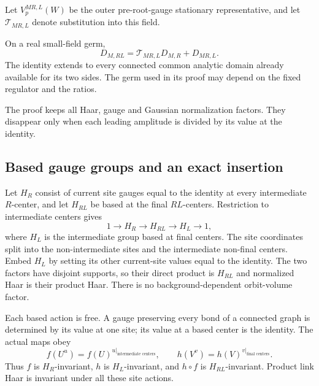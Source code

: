 Let $V_p^{MR,L}(W)$ be the outer pre-root-gauge stationary
representative, and let $\mathcal T_{MR,L}$ denote substitution
into this field.

\begin{theorem}
\label{olc-theorem}
On a real small-field germ,
\begin{equation}
 D_{M,RL}
   =\mathcal T_{MR,L}D_{M,R}+D_{MR,L}.
 \label{olc-cocycle}
\end{equation}
The identity extends to every connected common analytic domain
already available for its two sides. The germ used in its proof
may depend on the fixed regulator and the ratios.
\end{theorem}

The proof keeps all Haar, gauge and Gaussian normalization
factors. They disappear only when each leading amplitude is
divided by its value at the identity.

\subsection{Based gauge groups and an exact insertion}
\label{olc-groups-section}

Let $H_R$ consist of current site gauges equal to the identity
at every intermediate $R$-center, and let $H_{RL}$ be based
at the final $RL$-centers. Restriction to intermediate centers
gives
\begin{equation}
 1\longrightarrow H_R\longrightarrow H_{RL}
       \longrightarrow H_L\longrightarrow1,
 \label{olc-group-sequence}
\end{equation}
where $H_L$ is the intermediate group based at final centers.
The site coordinates split into the non-intermediate sites
and the intermediate non-final centers. Embed $H_L$ by setting
its other current-site values equal to the identity. The two
factors have disjoint supports, so their direct product is
$H_{RL}$ and normalized Haar is their product Haar.
There is no background-dependent orbit-volume factor.

Each based action is free. A gauge preserving every bond of a
connected graph is determined by its value at one site; its
value at a based center is the identity.
The actual maps obey
\begin{equation}
 f(U^u)=f(U)^{u|_{\text{intermediate centers}}},\qquad
 h(V^v)=h(V)^{v|_{\text{final centers}}}.
 \label{olc-equivariance}
\end{equation}
Thus $f$ is $H_R$-invariant, $h$ is $H_L$-invariant, and
$h\circ f$ is $H_{RL}$-invariant. Product link Haar is
invariant under all these site actions.

